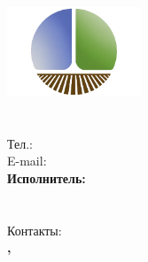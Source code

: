 \thispagestyle{empty}  %

\begin{center}
    \vspace*{1cm}
    \LARGE\textbf{\ReportTitle} \\[0.5cm]
    \large\textit{\ReportSubject} \\[2cm]
    
    \includegraphics[width=0.3\textwidth]{images/logo.png} \\[2cm]
    
    \large\textbf{\OrganizationName} \\[0.5cm]
    \small\OrganizationAddress \\
    \small Тел.: \OrganizationPhone \\
    \small E-mail: \OrganizationEmail \\[2cm]
    
    \large\textbf{Исполнитель:} \\
    \ExpertName \\
    \ExpertPosition \\
    Контакты: \ExpertContacts \\[2cm]
    
    \large\textbf{\ReportCity, \ReportYear}
\end{center}

\newpage
\pagestyle{fancy}  %